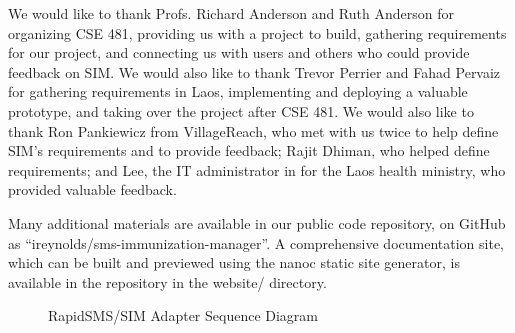\documentclass{acm_proc_article-sp}
\begin{document}
We would like to thank Profs. Richard Anderson and Ruth Anderson for organizing CSE 481, providing us with a project to build, gathering requirements for our project, and connecting us with users and others who could provide feedback on SIM. We would also like to thank Trevor Perrier and Fahad Pervaiz for gathering requirements in Laos, implementing and deploying a valuable prototype, and taking over the project after CSE 481. We would also like to thank Ron Pankiewicz from VillageReach, who met with us twice to help define SIM's requirements and to provide feedback; Rajit Dhiman, who helped define requirements; and Lee, the IT administrator in for the Laos health ministry, who provided valuable feedback.


  
\balancecolumns

\appendix
Many additional materials are available in our public code repository, on GitHub as ``ireynolds/sms-immunization-manager''. A comprehensive documentation site, which can be built and previewed using the nanoc static site generator, is available in the repository in the website/ directory.

\begin{figure*}
\centering
{}
\caption{RapidSMS/SIM Adapter Sequence Diagram}
\end{figure*}
\end{document}
